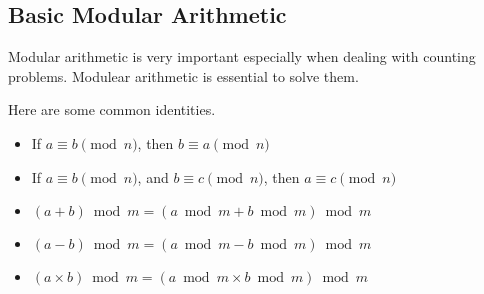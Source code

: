 \subsection{Basic Modular Arithmetic}
Modular arithmetic is very important especially when dealing with counting problems.
Modulear arithmetic is essential to solve them.

Here are some common identities.

\begin{itemize}
    \item If $a \equiv b \pmod{n}$, then $b \equiv a \pmod{n}$
    \item If $a \equiv b \pmod{n}$, and $b \equiv c \pmod{n}$, then $a \equiv c \pmod{n}$
    \item $(a + b) \bmod{m} = (a \bmod{m} + b \bmod{m}) \bmod{m}$
    \item $(a - b) \bmod{m} = (a \bmod{m} - b \bmod{m}) \bmod{m}$
    \item $(a \times b) \bmod{m} = (a \bmod{m} \times b \bmod{m}) \bmod{m}$
\end{itemize}